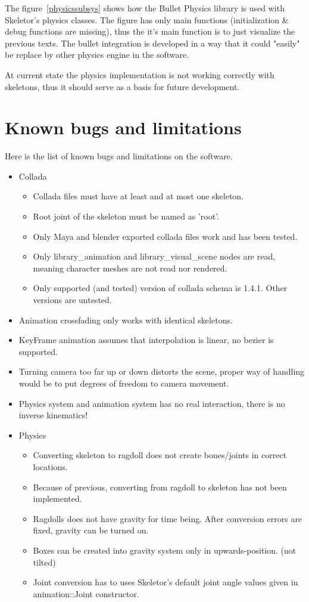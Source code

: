 \documentclass[11pt,twoside,a4paper]{article}
\begin{document}
The figure~\ref{physicssubsys} shows how the Bullet Physics library is used with Skeletor's physics classes. The figure has only main functions (initialization \& debug functions are missing), thus the it's main function is to just visualize the previous texts. The bullet integration is developed in a way that it could "easily" be replace by other physics engine in the software.

At current state the physics implementation is not working correctly with skeletons, thus it should serve as a basis for future development.

\section{Known bugs and limitations}

Here is the list of known bugs and limitations on the software.

\begin{itemize}
  \item Collada
  \begin{itemize}
    \item Collada files must have at least and at most one skeleton.
    \item Root joint of the skeleton must be named as 'root'.
    \item Only Maya and blender exported collada files work and has been tested.
    \item Only library\_animation and library\_visual\_scene nodes are read, meaning character meshes are not read nor rendered.
    \item Only supported (and tested) version of collada schema is 1.4.1. Other versions are untested.
  \end{itemize}
  \item Animation crossfading only works with identical skeletons.
  \item KeyFrame animation assumes that interpolation is linear, no bezier is supported.
  \item Turning camera too far up or down distorts the scene, proper way of handling would be to put degrees of freedom to camera movement.
  \item Physics system and animation system has no real interaction, there is no inverse kinematics!
  \item Physics
  \begin{itemize}
    \item Converting skeleton to ragdoll does not create bones/joints in correct locations.
    \item Because of previous, converting from ragdoll to skeleton has not been implemented.
    \item Ragdolls does not have gravity for time being. After conversion errors are fixed, gravity can be turned on.
    \item Boxes can be created into gravity system only in upwards-position. (not tilted)
    \item Joint conversion has to uses Skeletor's default joint angle values given in animation::Joint constructor.
  \end{itemize}
\end{itemize}
\end{document}
